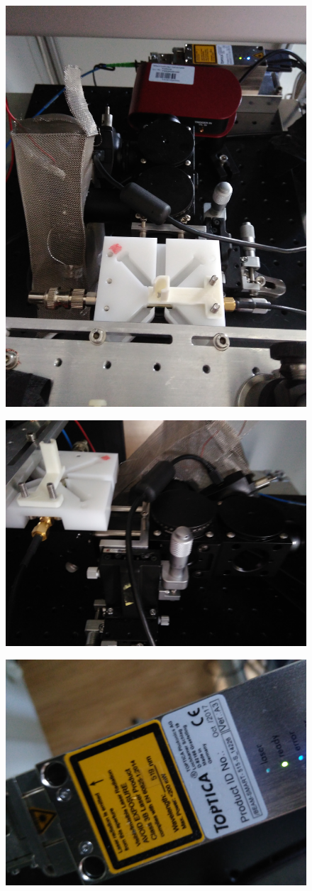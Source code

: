\begin{figure}
	\centering
	\includegraphics[width=0.7\linewidth]{../figures/IMG_20180530_161739}
	\caption{}
	\label{fig:img20180530161739}
\end{figure}
\begin{figure}
	\centering
	\includegraphics[width=0.7\linewidth]{../figures/IMG_20180530_153529}
	\caption{}
	\label{fig:img20180530153529}
\end{figure}
\begin{figure}
	\centering
	\includegraphics[width=0.7\linewidth]{../figures/IMG_20180530_153500}
	\caption{}
	\label{fig:img20180530153500}
\end{figure}
